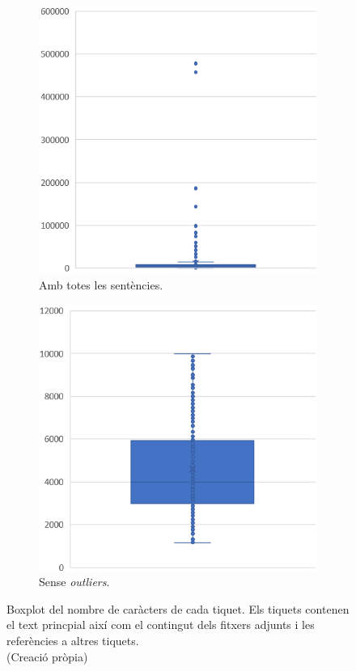 \begin{figure}[H]
    \centering
    \begin{subfigure}{.5\textwidth}
      \centering
      \includegraphics[width=.7\linewidth]{boxplot_num_chars_adj_refs.png}
      \caption{Amb totes les sentències.}
      \label{fig:boxplot_num_chars_adj_refs}
    \end{subfigure}%
    \begin{subfigure}{.5\textwidth}
      \centering
      \includegraphics[width=.7\linewidth]{boxplot_num_chars_adj_refs_outliers.png}
      \caption{Sense \textit{outliers}.}
      \label{fig:boxplot_num_chars_adj_refs_outliers}
    \end{subfigure}
    \caption[Boxplot dels caràcters de cada tiquet amb adjunts i referències]{Boxplot del nombre de caràcters de cada tiquet. Els tiquets contenen el text princpial així com el contingut dels fitxers adjunts i les referències a altres tiquets. \\ (Creació pròpia)}
    \label{fig:boxplot_num_chars_adj_refs_dos}
\end{figure}

